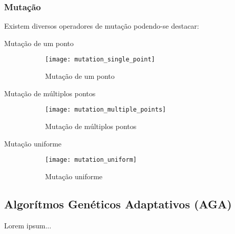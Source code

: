     \subsubsection{Mutação}
    Existem diversos operadores de mutação podendo-se destacar:
    \begin{description}
      \item[Mutação de um ponto] 
        \begin{figure}[!ht]
          \centering
          \texttt{[image: mutation\_single\_point]}
          \caption{Mutação de um ponto}
        \end{figure}
      \item[Mutação de múltiplos pontos]

        \begin{figure}[!ht]
          \centering
          \texttt{[image: mutation\_multiple\_points]}
          \caption{Mutação de múltiplos pontos}
        \end{figure}
      \item[Mutação uniforme]

        \begin{figure}[!ht]
          \centering
          \texttt{[image: mutation\_uniform]}
          \caption{Mutação uniforme}
        \end{figure}
    \end{description}
    
\subsection{Algorítmos Genéticos Adaptativos (AGA)}
Lorem ipsum...